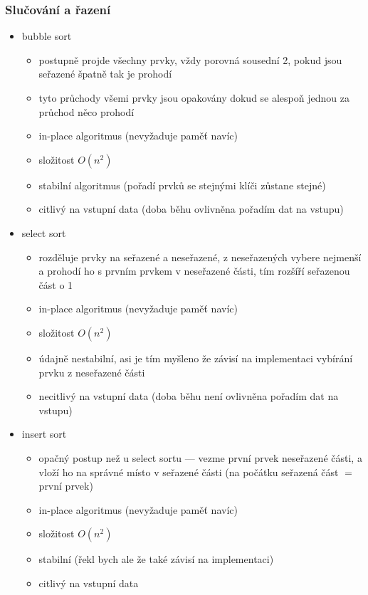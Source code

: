 \subsubsection*{Slučování a řazení}
\begin{itemize}
	\item bubble sort
	\begin{itemize}
		\item postupně projde všechny prvky, vždy porovná sousední 2, pokud jsou seřazené špatně tak je prohodí
		\item tyto průchody všemi prvky jsou opakovány dokud se alespoň jednou za průchod něco prohodí
		\item in-place algoritmus (nevyžaduje paměť navíc)
		\item složitost $O(n^2)$
		\item stabilní algoritmus (pořadí prvků se stejnými klíči zůstane stejné)
		\item citlivý na vstupní data (doba běhu ovlivněna pořadím dat na vstupu)
	\end{itemize}
	\item select sort
	\begin{itemize}
		\item rozděluje prvky na seřazené a neseřazené, z neseřazených vybere nejmenší a prohodí ho s prvním prvkem v neseřazené části, tím rozšíří seřazenou část o 1
		\item in-place algoritmus (nevyžaduje paměť navíc)
		\item složitost $O(n^2)$
		\item údajně nestabilní, asi je tím myšleno že závisí na implementaci vybírání prvku z neseřazené části
		\item necitlivý na vstupní data (doba běhu není ovlivněna pořadím dat na vstupu)
	\end{itemize}
	\item insert sort 
	\begin{itemize}
		\item opačný postup než u select sortu --- vezme první prvek neseřazené části, a vloží ho na správné místo v seřazené části (na počátku seřazená část $=$ první prvek)
		\item in-place algoritmus (nevyžaduje paměť navíc)
		\item složitost $O(n^2)$
		\item stabilní (řekl bych ale že také závisí na implementaci)
		\item citlivý na vstupní data
	\end{itemize}

\end{itemize}
